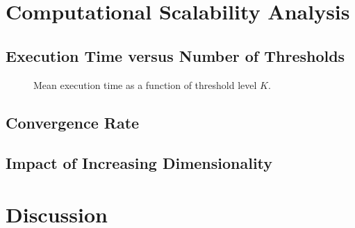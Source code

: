 \documentclass[review]{elsarticle}
\begin{document}
\section{Computational Scalability Analysis}
\label{sec:scalability}


\subsection{Execution Time versus Number of Thresholds}

\begin{figure}[H]
    \centering
    \caption{Mean execution time as a function of threshold level $K$.}
    \label{fig:runtime}
\end{figure}

%


\subsection{Convergence Rate}



\subsection{Impact of Increasing Dimensionality}

%
%
%



\section{Discussion}
\label{sec:discussion}

%
%
\end{document}
